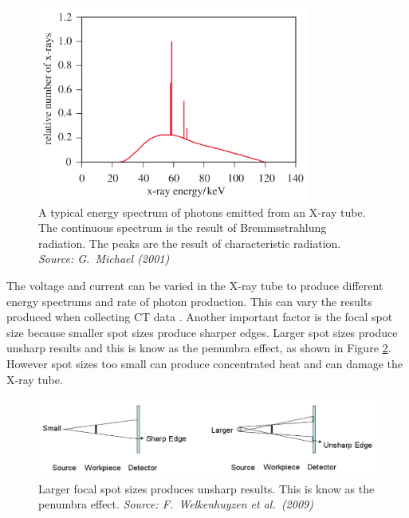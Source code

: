 \documentclass[12pt]{report}
\begin{document}
\begin{figure}
\centering
\includegraphics[width=0.8\textwidth]{figures/x_ray_spectrum.png}
\caption{A typical energy spectrum of photons emitted from an X-ray tube. The continuous spectrum is the result of Bremmsstrahlung radiation. The peaks are the result of characteristic radiation. \emph{Source: G.~Michael (2001) \cite{michael2001x}}}
\label{fig:x_ray_spectrum}
\end{figure}

The voltage and current can be varied in the X-ray tube to produce different energy spectrums and rate of photon production. This can vary the results produced when collecting CT data \cite{cantatore2011introduction}. Another important factor is the focal spot size because smaller spot sizes produce sharper edges. Larger spot sizes produce unsharp results and this is know as the penumbra effect, as shown in Figure \ref{fig:x_ray_penumbra}. However spot sizes too small can produce concentrated heat \cite{welkenhuyzen2009industrial} and can damage the X-ray tube.

\begin{figure}
\centering
\includegraphics[width=1\textwidth]{figures/x_ray_penumbra.png}
\caption{Larger focal spot sizes produces unsharp results. This is know as the penumbra effect. \emph{Source: F.~Welkenhuyzen et al.~(2009)\cite{welkenhuyzen2009industrial}}}
\label{fig:x_ray_penumbra}
\end{figure}
\end{document}
